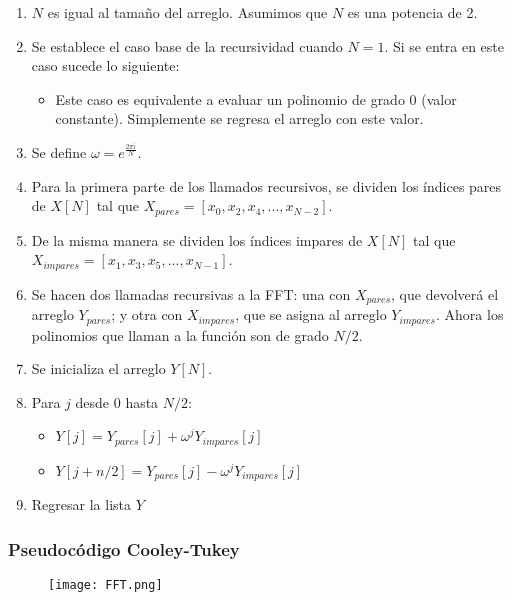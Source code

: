 \documentclass{article}
\begin{document}
\begin{enumerate}
    \item $N$ es igual al tamaño del arreglo. Asumimos que $N$ es una potencia de 2. 
    \item Se establece el caso base de la recursividad cuando $N=1$. Si se entra en este caso sucede lo siguiente:
    \begin{itemize}
        \item Este caso es equivalente a evaluar un polinomio de grado 0 (valor constante). Simplemente se regresa el arreglo con este valor.
    \end{itemize}
    \item Se define $\omega = e^{\frac{2\pi i}{N}}$.
    \item Para la primera parte de los llamados recursivos, se dividen los índices pares de $X[N]$ tal que $X_{pares}=[x_{0}, x_{2}, x_{4},...,x_{N-2}]$.
    \item De  la misma manera se dividen los índices impares de $X[N]$ tal que $X_{impares}=[x_{1},x_{3}, x_{5},...,x_{N-1}]$.
    \item Se hacen dos llamadas recursivas a la FFT: una con $X_{pares}$, que devolverá el arreglo $Y_{pares}$; y otra con $X_{impares}$, que se asigna al arreglo $Y_{impares}$. Ahora los polinomios que llaman a la función son de grado $N/2$.
    \item Se inicializa el arreglo $Y[N]$.
    \item Para $j$ desde 0 hasta $N/2$:
    \begin{itemize}
        \item $Y[j] = Y_{pares}[j]+\omega^{j} Y_{impares}[j]$
        \item $Y[j+n/2] = Y_{pares}[j]-\omega^{j} Y_{impares}[j]$
    \end{itemize}
     \item Regresar la lista $Y$
\end{enumerate}
\newpage
\subsubsection{Pseudocódigo Cooley-Tukey}
\begin{figure}[h]
\texttt{[image: FFT.png]}
\end{figure}
\newpage
\end{document}
